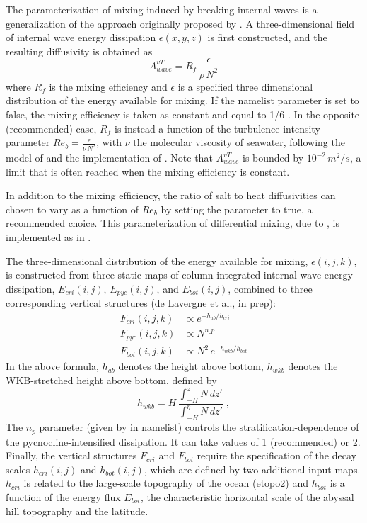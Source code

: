 \documentclass[../main/NEMO_manual]{subfiles}
\begin{document}
%

The parameterization of mixing induced by breaking internal waves is a generalization of
the approach originally proposed by \citet{St_Laurent_al_GRL02}.
A three-dimensional field of internal wave energy dissipation $\epsilon(x,y,z)$ is first constructed,
and the resulting diffusivity is obtained as 
\[
  A^{vT}_{wave} =  R_f \,\frac{ \epsilon }{ \rho \, N^2 }
\]
where $R_f$ is the mixing efficiency and $\epsilon$ is a specified three dimensional distribution of
the energy available for mixing.
If the  namelist parameter is set to false, the mixing efficiency is taken as constant and
equal to 1/6 \citep{Osborn_JPO80}.
In the opposite (recommended) case, $R_f$ is instead a function of
the turbulence intensity parameter $Re_b = \frac{ \epsilon}{\nu \, N^2}$,
with $\nu$ the molecular viscosity of seawater, following the model of \cite{Bouffard_Boegman_DAO2013} and
the implementation of \cite{de_lavergne_JPO2016_efficiency}.
Note that $A^{vT}_{wave}$ is bounded by $10^{-2}\,m^2/s$, a limit that is often reached when
the mixing efficiency is constant.

In addition to the mixing efficiency, the ratio of salt to heat diffusivities can chosen to vary 
as a function of $Re_b$ by setting the  parameter to true, a recommended choice. 
This parameterization of differential mixing, due to \cite{Jackson_Rehmann_JPO2014},
is implemented as in \cite{de_lavergne_JPO2016_efficiency}.

The three-dimensional distribution of the energy available for mixing, $\epsilon(i,j,k)$,
is constructed from three static maps of column-integrated internal wave energy dissipation,
$E_{cri}(i,j)$, $E_{pyc}(i,j)$, and $E_{bot}(i,j)$, combined to three corresponding vertical structures
(de Lavergne et al., in prep):
\begin{align*}
  F_{cri}(i,j,k) &\propto e^{-h_{ab} / h_{cri} }\\
  F_{pyc}(i,j,k) &\propto N^{n\_p}\\
  F_{bot}(i,j,k) &\propto N^2 \, e^{- h_{wkb} / h_{bot} }
\end{align*} 
In the above formula, $h_{ab}$ denotes the height above bottom,
$h_{wkb}$ denotes the WKB-stretched height above bottom, defined by
\[
  h_{wkb} = H \, \frac{ \int_{-H}^{z} N \, dz' } { \int_{-H}^{\eta} N \, dz'  } \; ,
\]
The $n_p$ parameter (given by  in  namelist)
controls the stratification-dependence of the pycnocline-intensified dissipation.
It can take values of 1 (recommended) or 2.
Finally, the vertical structures $F_{cri}$ and $F_{bot}$ require the specification of
the decay scales $h_{cri}(i,j)$ and $h_{bot}(i,j)$, which are defined by two additional input maps.
$h_{cri}$ is related to the large-scale topography of the ocean (etopo2) and
$h_{bot}$ is a function of the energy flux $E_{bot}$, the characteristic horizontal scale of
the abyssal hill topography \citep{Goff_JGR2010} and the latitude.


\biblio

\pindex
\end{document}
